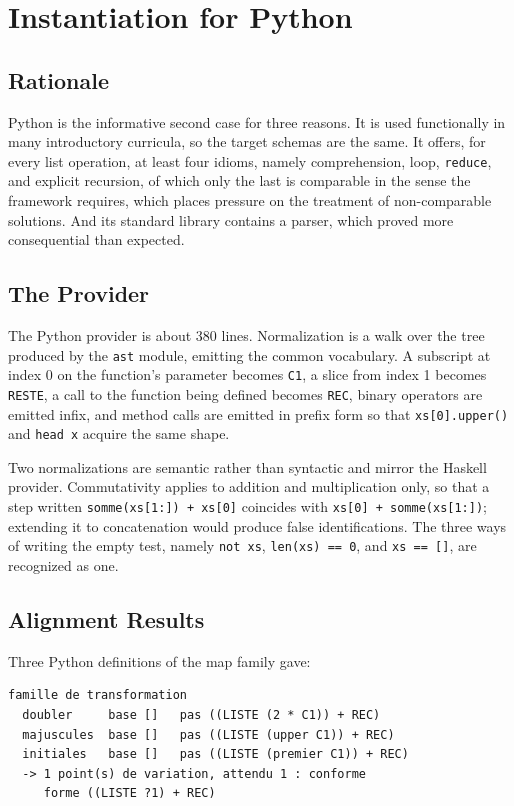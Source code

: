 \documentclass[10pt,twocolumn,letterpaper]{article}
\begin{document}
\section{Instantiation for Python}
\subsection{Rationale}
Python is the informative second case for three reasons. It is used
functionally in many introductory curricula, so the target schemas are
the same. It offers, for every list operation, at least four idioms,
namely comprehension, loop, \texttt{reduce}, and explicit recursion, of
which only the last is comparable in the sense the framework requires,
which places pressure on the treatment of non-comparable solutions. And
its standard library contains a parser, which proved more consequential
than expected.

\subsection{The Provider}
The Python provider is about 380 lines. Normalization is a walk over the tree
produced by the \texttt{ast} module, emitting the common vocabulary. A
subscript at index 0 on the function's parameter becomes \texttt{C1}, a
slice from index 1 becomes \texttt{RESTE}, a call to the function being
defined becomes \texttt{REC}, binary operators are emitted infix, and
method calls are emitted in prefix form so that
\texttt{xs[0].upper()} and \texttt{head x} acquire the same shape.

Two normalizations are semantic rather than syntactic and mirror the
Haskell provider. Commutativity applies to addition and multiplication
only, so that a step written \texttt{somme(xs[1:]) + xs[0]}
coincides with \texttt{xs[0] + somme(xs[1:])}; extending it to
concatenation would produce false identifications. The three ways of
writing the empty test, namely \texttt{not xs},
\texttt{len(xs) == 0}, and \texttt{xs == []}, are recognized as
one.

\subsection{Alignment Results}
Three Python definitions of the map family gave:
\begin{samepage}\noindent\begin{minipage}{\linewidth}
\begin{verbatim}
famille de transformation
  doubler     base []   pas ((LISTE (2 * C1)) + REC)
  majuscules  base []   pas ((LISTE (upper C1)) + REC)
  initiales   base []   pas ((LISTE (premier C1)) + REC)
  -> 1 point(s) de variation, attendu 1 : conforme
     forme ((LISTE ?1) + REC)
\end{verbatim}
\end{minipage}\end{samepage}
\end{document}
